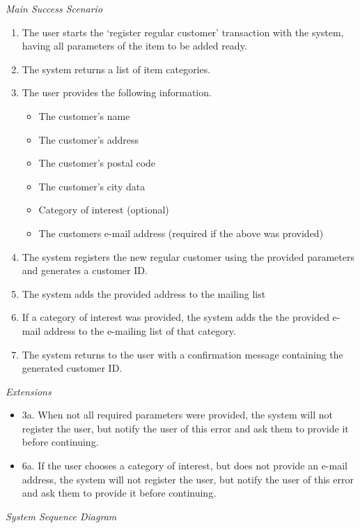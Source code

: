 \textsl{Main Success Scenario}
\begin{enumerate}[noitemsep]
	\item The user starts the `register regular customer' transaction with the system, having all parameters of the item to be added ready.
	\item The system returns a list of item categories.
	\item The user provides the following information.
	\begin{itemize}[noitemsep]
		\item The customer's name
		\item The customer's address
		\item The customer's postal code
		\item The customer's city data
		\item Category of interest (optional)
		\item The customers e-mail address (required if the above was provided)
	\end{itemize}
	\item The system registers the new regular customer using the provided parameters and generates a customer ID.
	\item The system adds the provided address to the mailing list
	\item If a category of interest was provided, the system adds the the provided e-mail address to the e-mailing list of that category.
	\item The system returns to the user with a confirmation message containing the generated customer ID. 
\end{enumerate}
\textsl{Extensions}
\begin{itemize}[noitemsep]
	\item 3a. When not all required parameters were provided, the system will not register the user, but notify the user of this error and ask them to provide it before continuing.
	\item 6a. If the user chooses a category of interest, but does not provide an e-mail address, the system will not register the user, but notify the user of this error and ask them to provide it before continuing.
\end{itemize}
\newpage
\textsl{System Sequence Diagram}
